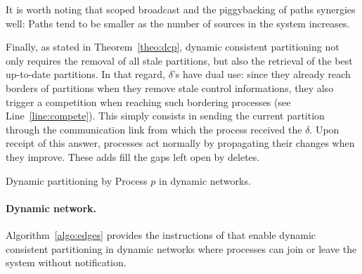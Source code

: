 \noindent It is worth noting that scoped broadcast and the
piggybacking of paths synergies well: Paths tend to be smaller as the
number of sources in the system increases.

Finally, as stated in Theorem~\ref{theo:dcp}, dynamic consistent
partitioning not only requires the removal of all stale partitions,
but also the retrieval of the best up-to-date partitions. In that
regard, $\delta$'s have dual use: since they already reach borders of
partitions when they remove stale control informations, they also
trigger a competition when reaching such bordering processes (see
Line~\ref{line:compete}). This simply consists in sending the current
partition through the communication link from which the process
received the $\delta$. Upon receipt of this answer, processes act
normally by propagating their changes when they improve. These adds
fill the gaps left open by deletes.

\begin{algorithm}
  
  \caption{\label{algo:edges}Dynamic partitioning by Process $p$ in dynamic networks.}
\end{algorithm}

\paragraph{Dynamic network.}
Algorithm~\ref{algo:edges} provides the instructions of \NAME that
enable dynamic consistent partitioning in dynamic networks where
processes can join or leave the system without
notification. 




